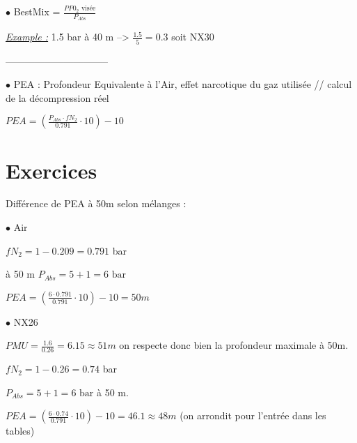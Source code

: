 \documentclass[12pt,a4paper,notitlepage,colorinlistoftodos]{article}
\begin{document}
$\bullet$ BestMix = $\frac{PP0_2 \text{ visée}}{P_{Abs}}$ 

\underline{\textit{Example :}} 1.5 bar à 40 m --> $\frac{1.5}{5} = 0.3$ soit NX30

--------------------------------

$\bullet$ PEA : Profondeur Equivalente à l'Air, effet narcotique du gaz utilisée // calcul de la décompression réel

$PEA = \left(\frac{P_{Abs} \cdot fN_2}{0.791} \cdot 10\right) -10 $

\section{Exercices}

\begin{multicols}{2}

Différence de PEA à 50m selon mélanges :

$\bullet$ Air

$fN_2 = 1 - 0.209 = 0.791$ bar

à 50 m  $P_{Abs} = 5 + 1 = 6 \text{ bar}$

$PEA = \left(\frac{6 \cdot 0.791}{0.791} \cdot 10\right) -10 = 50m$
\\

\columnbreak

$\bullet$ NX26

$PMU = \frac{1.6}{0.26} = 6.15 \approx 51m$ on respecte donc bien la profondeur maximale à 50m.

$fN_2 = 1 - 0.26 = 0.74$ bar

$P_{Abs} = 5 + 1 = 6 \text{ bar}$ à 50 m.

$PEA = \left(\frac{6 \cdot 0.74}{0.791} \cdot 10\right) -10 = 46.1 \approx 48 m$
 (on arrondit pour l'entrée dans les tables)
 
\end{multicols}

\cite{}


\end{document}
